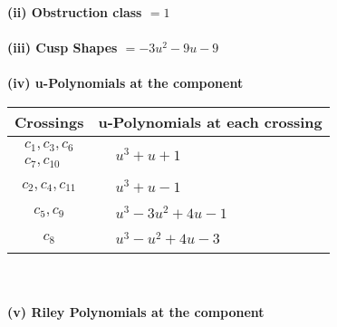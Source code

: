 \documentclass[1p]{elsarticle_modified}
\theoremstyle{definition}
\begin{document}
\flushleft \textbf{(ii) Obstruction class $= 1$}\\~\\
\flushleft \textbf{(iii) Cusp Shapes $= -3 u^2-9 u-9$}\\~\\
\newpage\renewcommand{\arraystretch}{1}
\flushleft \textbf{(iv) u-Polynomials at the component}\newline \\
\begin{tabular}{m{50pt}|m{274pt}}
Crossings & \hspace{64pt}u-Polynomials at each crossing \\
\hline $$\begin{aligned}c_{1},c_{3},c_{6}\\c_{7},c_{10}\end{aligned}$$&$\begin{aligned}
&u^3+u+1
\end{aligned}$\\
\hline $$\begin{aligned}c_{2},c_{4},c_{11}\end{aligned}$$&$\begin{aligned}
&u^3+u-1
\end{aligned}$\\
\hline $$\begin{aligned}c_{5},c_{9}\end{aligned}$$&$\begin{aligned}
&u^3-3 u^2+4 u-1
\end{aligned}$\\
\hline $$\begin{aligned}c_{8}\end{aligned}$$&$\begin{aligned}
&u^3- u^2+4 u-3
\end{aligned}$\\
\hline
\end{tabular}\\~\\
\newpage\renewcommand{\arraystretch}{1}
\flushleft \textbf{(v) Riley Polynomials at the component}\newline \\
\end{document}
